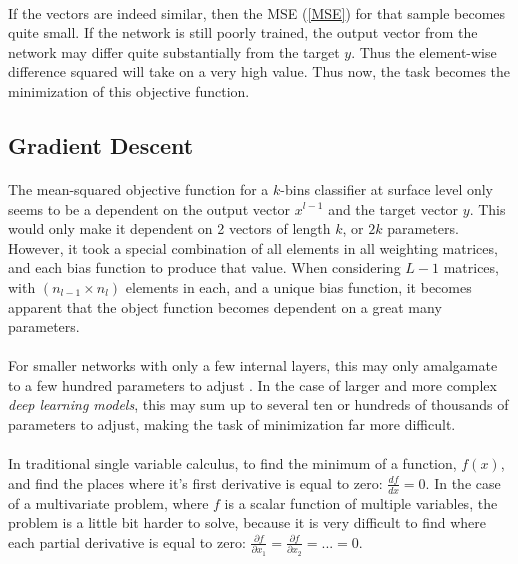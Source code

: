 \documentclass[12pt,letterpaper]{article}
\begin{document}
\paragraph*{}If the vectors are indeed similar, then the MSE (\ref{MSE}) for that sample becomes quite small. If the network is still poorly trained, the output vector from the network may differ quite substantially from the target $y$. Thus the element-wise difference squared will take on a very high value. Thus now, the task becomes the minimization of this objective function.


\subsection{Gradient Descent}
\paragraph*{}The mean-squared objective function for a $k$-bins classifier at surface level only seems to be a dependent on the output vector $x^{l-1}$ and the target vector $y$. This would only make it dependent on 2 vectors of length $k$, or $2k$ parameters. However, it took a special combination of all elements in all weighting matrices, and each bias function to produce that value. When considering $L-1$ matrices, with $(n_{l-1} \times n_l)$ elements in each, and a unique bias function, it becomes apparent that the object function becomes dependent on a great many parameters.
\paragraph*{}For smaller networks with only a few internal layers, this may only amalgamate to a few hundred parameters to adjust \cite{Goodfellow}. In the case of larger and more complex \textit{deep learning models}, this may sum up to several ten or hundreds of thousands of parameters to adjust, making the task of minimization far more difficult. 
\paragraph*{}In traditional single variable calculus, to find the minimum of a function, $f(x)$, and find the places where it's first derivative is equal to zero: $\frac{df}{dx} = 0$. In the case of a multivariate problem, where $f$ is a scalar function of multiple variables, the problem is a little bit harder to solve, because it is very difficult to find where each partial derivative is equal to zero: $\frac{\partial f}{\partial x_1} = \frac{\partial f}{\partial x_2} = ... = 0$.
\end{document}
